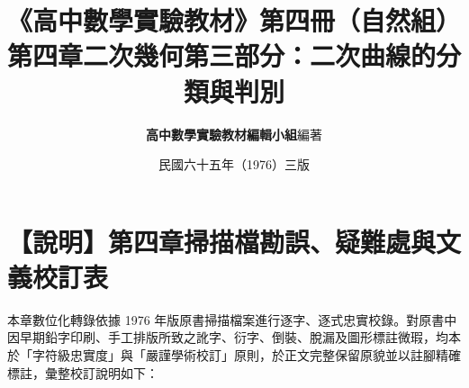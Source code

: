 \documentclass[a4paper,12pt,twoside]{article}
\title{\LARGE\textbf{《高中數學實驗教材》第四冊（自然組）}\\[0.5em] \Large\textbf{第四章\quad 二次幾何\quad 第三部分：二次曲線的分類與判別}}
\author{\textbf{高中數學實驗教材編輯小組}\quad 編著}
\date{民國六十五年（1976）三版}
\begin{document}
\maketitle
\thispagestyle{firstpage}

\section*{【說明】第四章掃描檔勘誤、疑難處與文義校訂表}

本章數位化轉錄依據 1976 年版原書掃描檔案進行逐字、逐式忠實校錄。對原書中因早期鉛字印刷、手工排版所致之訛字、衍字、倒裝、脫漏及圖形標註微瑕，均本於「字符級忠實度」與「嚴謹學術校訂」原則，於正文完整保留原貌並以註腳精確標註，彙整校訂說明如下：
\end{document}
